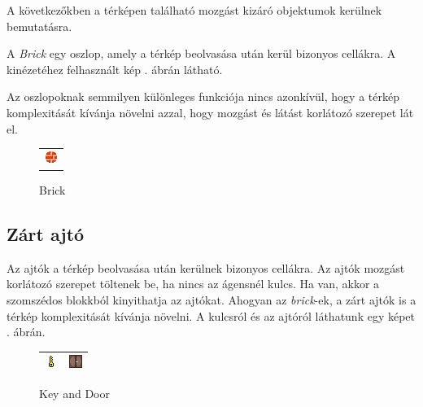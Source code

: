 \label{object}

A következőkben a térképen található mozgást kizáró objektumok kerülnek bemutatásra.

\label{brick}

A \textit{Brick} egy oszlop, amely a térkép beolvasása után kerül bizonyos cellákra. A kinézetéhez felhasznált kép . ábrán látható.

Az oszlopoknak semmilyen különleges funkciója nincs azonkívül, hogy a térkép komplexitását kívánja növelni azzal,
hogy mozgást és látást korlátozó szerepet lát el.

\begin{figure}[h!]
    \begin{center}
        \begin{tabular}{c}
            \includegraphics[scale=10]{images/object_brick.png}
        \end{tabular}
        \caption{Brick}
        \label{tbl:Brick}
    \end{center}
\end{figure}

\subsection{Zárt ajtó}

Az ajtók a térkép beolvasása után kerülnek bizonyos cellákra.
Az ajtók mozgást korlátozó szerepet töltenek be, ha nincs az ágensnél kulcs. Ha van, akkor a szomszédos blokkból kinyithatja az ajtókat.
Ahogyan az \textit{brick}-ek, a zárt ajtók is a térkép komplexitását kívánja növelni. A kulcsról és az ajtóról láthatunk egy képet . ábrán.

\begin{figure}[h!]
    \begin{center}
        \begin{tabular}{ | c | c | }
            \hline
            \includegraphics[scale=10]{images/key.png}
            & 
            \includegraphics[scale=10]{images/Door.png}    
            \\
            \hline
        \end{tabular}
        \caption{Key and Door}
        \label{tbl:Key and Door}
    \end{center}
\end{figure}


